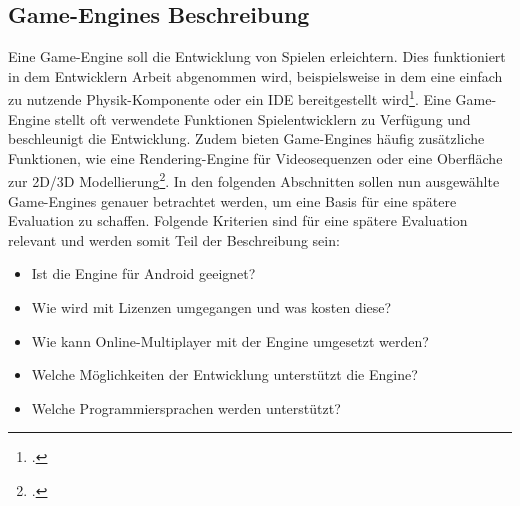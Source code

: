 \subsection{Game-Engines Beschreibung}
	Eine Game-Engine soll die Entwicklung von Spielen erleichtern. Dies funktioniert in dem Entwicklern Arbeit abgenommen wird, beispielsweise in dem eine einfach zu nutzende Physik-Komponente oder ein \gls{IDE} bereitgestellt wird\footcite[Jason Gregory - Game Engine Architecture (S.11)]{gregory2014game}. Eine Game-Engine stellt oft verwendete Funktionen Spielentwicklern zu Verfügung und beschleunigt die Entwicklung. Zudem bieten Game-Engines häufig zusätzliche Funktionen, wie eine Rendering-Engine für Videosequenzen oder eine Oberfläche zur 2D/3D Modellierung\footcite[Jason Gregory - Game Engine Architecture (S. 36ff.)]{gregory2014game}.
	In den folgenden Abschnitten sollen nun ausgewählte Game-Engines genauer betrachtet werden, um eine Basis für eine spätere Evaluation zu schaffen. Folgende Kriterien sind für eine spätere Evaluation relevant und werden somit Teil der Beschreibung sein:
	\begin{itemize}
		\item{Ist die Engine für Android geeignet?}
		\item{Wie wird mit Lizenzen umgegangen und was kosten diese?}
		\item{Wie kann Online-Multiplayer mit der Engine umgesetzt werden?}
		\item{Welche Möglichkeiten der Entwicklung unterstützt die Engine?}
		\item{Welche Programmiersprachen werden unterstützt?}
	\end{itemize}

